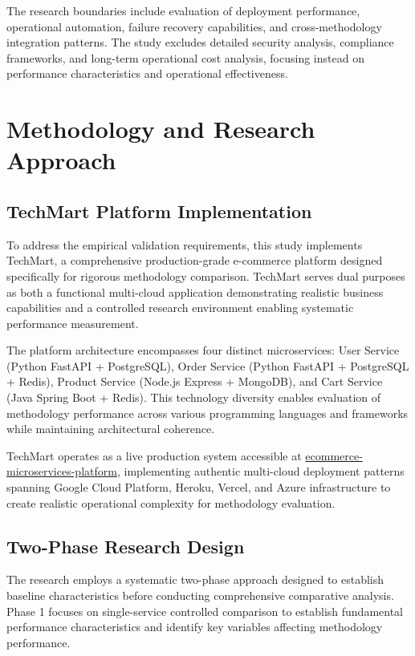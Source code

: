 The research boundaries include evaluation of deployment performance, operational automation, failure recovery capabilities, and cross-methodology integration patterns. The study excludes detailed security analysis, compliance frameworks, and long-term operational cost analysis, focusing instead on performance characteristics and operational effectiveness.

\section{Methodology and Research Approach}

\subsection{TechMart Platform Implementation}
To address the empirical validation requirements, this study implements TechMart, a comprehensive production-grade e-commerce platform designed specifically for rigorous methodology comparison. TechMart serves dual purposes as both a functional multi-cloud application demonstrating realistic business capabilities and a controlled research environment enabling systematic performance measurement.

The platform architecture encompasses four distinct microservices: User Service (Python FastAPI + PostgreSQL), Order Service (Python FastAPI + PostgreSQL + Redis), Product Service (Node.js Express + MongoDB), and Cart Service (Java Spring Boot + Redis). This technology diversity enables evaluation of methodology performance across various programming languages and frameworks while maintaining architectural coherence.

TechMart operates as a live production system accessible at \href{https://github.com/kousaila502/ecommerce-microservices-platform}{ecommerce-microservices-platform}, implementing authentic multi-cloud deployment patterns spanning Google Cloud Platform, Heroku, Vercel, and Azure infrastructure to create realistic operational complexity for methodology evaluation.

\subsection{Two-Phase Research Design}
The research employs a systematic two-phase approach designed to establish baseline characteristics before conducting comprehensive comparative analysis. Phase 1 focuses on single-service controlled comparison to establish fundamental performance characteristics and identify key variables affecting methodology performance.

